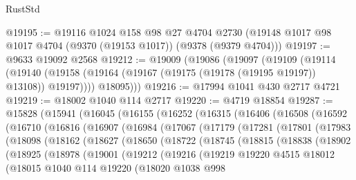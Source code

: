 \begin{lexlean}{RustStd}
\begin{coremodule}
@19195 := @19116
    @1024
    @158
    @98
    @27
    @4704
    @2730
    (@19148 @1017 @98 @1017 @4704 (@9370 (@19153 @1017)) (@9378 (@9379 @4704)))
@19197 := @9633 @19092 @2568
@19212 := @19009
    (@19086
      (@19097
        (@19109
          (@19114
            (@19140 (@19158 (@19164 (@19167 (@19175 (@19178 (@19195 @19197)) @13108)) @19197))))
          @18095)))
@19216 := @17994 @1041 @430 @2717 @4721
@19219 := @18002 @1040 @114 @2717
@19220 := @4719 @18854
@19287 := @15828
    (@15941
      (@16045
        (@16155
          (@16252
            (@16315
              (@16406
                (@16508
                  (@16592
                    (@16710
                      (@16816
                        (@16907
                          (@16984
                            (@17067
                              (@17179
                                (@17281
                                  (@17801
                                    (@17983
                                      (@18098
                                        (@18162
                                          (@18627
                                            (@18650
                                              (@18722
                                                (@18745
                                                  (@18815
                                                    (@18838
                                                      (@18902
                                                        (@18925
                                                          (@18978
                                                            (@19001
                                                              (@19212
                                                                (@19216
                                                                  (@19219
                                                                    @19220
                                                                    @4515
                                                                    @18012
                                                                    (@18015
                                                                      @1040
                                                                      @114
                                                                      @19220
                                                                      (@18020
                                                                        @1038
                                                                        @998

\end{coremodule}
\end{lexlean}
